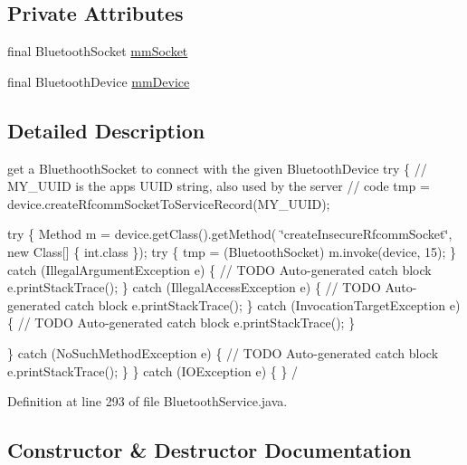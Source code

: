 \subsection*{Private Attributes}
\begin{DoxyCompactItemize}
\item 
final Bluetooth\+Socket \mbox{\hyperlink{classhi_1_1world_1_1hello_1_1myapplication_1_1_bluetooth_service_1_1_connect_thread_a7f0361ed7d37696342b8c6f28caf325a}{mm\+Socket}}
\item 
final Bluetooth\+Device \mbox{\hyperlink{classhi_1_1world_1_1hello_1_1myapplication_1_1_bluetooth_service_1_1_connect_thread_ac044aa259a4347bbdc116e47ad22dee0}{mm\+Device}}
\end{DoxyCompactItemize}


\subsection{Detailed Description}
get a Bluethooth\+Socket to connect with the given Bluetooth\+Device try \{ // M\+Y\+\_\+\+U\+U\+ID is the app\textquotesingle{}s U\+U\+ID string, also used by the server // code tmp = device.\+create\+Rfcomm\+Socket\+To\+Service\+Record(\+M\+Y\+\_\+\+U\+U\+I\+D); 

try \{ Method m = device.\+get\+Class().get\+Method( \char`\"{}create\+Insecure\+Rfcomm\+Socket\char`\"{}, new Class\mbox{[}\mbox{]} \{ int.\+class \}); try \{ tmp = (Bluetooth\+Socket) m.\+invoke(device, 15); \} catch (Illegal\+Argument\+Exception e) \{ // T\+O\+DO Auto-\/generated catch block e.\+print\+Stack\+Trace(); \} catch (Illegal\+Access\+Exception e) \{ // T\+O\+DO Auto-\/generated catch block e.\+print\+Stack\+Trace(); \} catch (Invocation\+Target\+Exception e) \{ // T\+O\+DO Auto-\/generated catch block e.\+print\+Stack\+Trace(); \}

\} catch (No\+Such\+Method\+Exception e) \{ // T\+O\+DO Auto-\/generated catch block e.\+print\+Stack\+Trace(); \} \} catch (I\+O\+Exception e) \{ \} / 

Definition at line 293 of file Bluetooth\+Service.\+java.



\subsection{Constructor \& Destructor Documentation}
\mbox{\label{classhi_1_1world_1_1hello_1_1myapplication_1_1_bluetooth_service_1_1_connect_thread_a2866179d3664e57d54430d8e044f052d}} 
